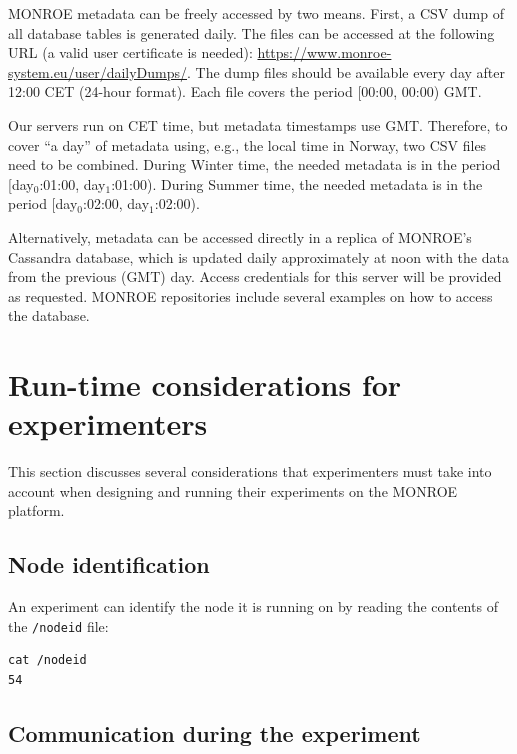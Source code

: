 \documentclass[a4paper,10pt]{article}
\newcommand{\VerbatimFont}{\footnotesize}
\newcommand{\monroe}{MONROE}
\newcommand{\identifier}[1]{{\texttt{\small{#1}}}}
\begin{document}
\monroe{} metadata can be freely accessed by two means.
First, a CSV dump of all database tables is generated daily.
The files can be accessed at the following URL (a valid user certificate is needed): \url{https://www.monroe-system.eu/user/dailyDumps/}.
The dump files should be available every day after 12:00 CET (24-hour format).
Each file covers the period [00:00, 00:00) GMT.

Our servers run on CET time, but metadata timestamps use GMT.
Therefore, to cover ``a day'' of metadata using, e.g., the local time in Norway, two CSV files need to be combined.
During Winter time, the needed metadata is in the period [day$_0$:01:00, day$_1$:01:00).
During Summer time, the needed metadata is in the period [day$_0$:02:00, day$_1$:02:00).

Alternatively, metadata can be accessed directly in a replica of \monroe{}'s Cassandra database, which is updated daily approximately at noon with the data from the previous (GMT) day.
Access credentials for this server will be provided as requested.
\monroe{} repositories include several examples on how to access the database.



\section{Run-time considerations for experimenters}
\label{sec:experimentRuntime}

This section discusses several considerations that experimenters must take into account when designing and running their experiments on the \monroe{} platform.

\subsection{Node identification}
\label{subsec:nodeIdentification}

An experiment can identify the node it is running on by reading the contents of the \identifier{/nodeid} file:
{\VerbatimFont
\begin{verbatim}
cat /nodeid
54
\end{verbatim}}

\subsection{Communication during the experiment}
\label{subsec:communicationDuringExperiment}
\end{document}
